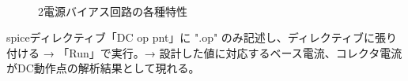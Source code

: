 \begin{figure}[htb]
  \begin{center}
  ~
  \caption{2電源バイアス回路の各種特性}
  \label{2den_kaiseki}
  \end{center}
\end{figure}

spiceディレクティブ「DC op pnt」に ".op" のみ記述し、ディレクティブに張り付ける → 「Run」で実行。→ 設計した値に対応するベース電流、コレクタ電流がDC動作点の解析結果として現れる。

